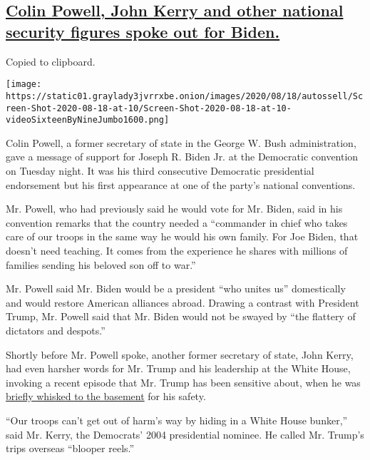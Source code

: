 \hypertarget{colin-powell-john-kerry-and-other-national-security-figures-spoke-out-for-biden}{%
\subsection{\texorpdfstring{\protect\hyperlink{colin-powell-john-kerry-and-other-national-security-figures-spoke-out-for-biden}{Colin
Powell, John Kerry and other national security figures spoke out for
Biden.}}{Colin Powell, John Kerry and other national security figures spoke out for Biden.}}\label{colin-powell-john-kerry-and-other-national-security-figures-spoke-out-for-biden}}

Copied to clipboard.

\texttt{[image: https://static01.graylady3jvrrxbe.onion/images/2020/08/18/autossell/Screen-Shot-2020-08-18-at-10/Screen-Shot-2020-08-18-at-10-videoSixteenByNineJumbo1600.png]}

Colin Powell, a former secretary of state in the George W. Bush
administration, gave a message of support for Joseph R. Biden Jr. at the
Democratic convention on Tuesday night. It was his third consecutive
Democratic presidential endorsement but his first appearance at one of
the party's national conventions.

Mr. Powell, who had previously said he would vote for Mr. Biden, said in
his convention remarks that the country needed a ``commander in chief
who takes care of our troops in the same way he would his own family.
For Joe Biden, that doesn't need teaching. It comes from the experience
he shares with millions of families sending his beloved son off to
war.''

Mr. Powell said Mr. Biden would be a president ``who unites us''
domestically and would restore American alliances abroad. Drawing a
contrast with President Trump, Mr. Powell said that Mr. Biden would not
be swayed by ``the flattery of dictators and despots.''

Shortly before Mr. Powell spoke, another former secretary of state, John
Kerry, had even harsher words for Mr. Trump and his leadership at the
White House, invoking a recent episode that Mr. Trump has been sensitive
about, when he was
\href{https://www.nytimes3xbfgragh.onion/2020/05/31/us/politics/trump-protests-george-floyd.html}{briefly
whisked to the basement} for his safety.

``Our troops can't get out of harm's way by hiding in a White House
bunker,'' said Mr. Kerry, the Democrats' 2004 presidential nominee. He
called Mr. Trump's trips overseas ``blooper reels.''

